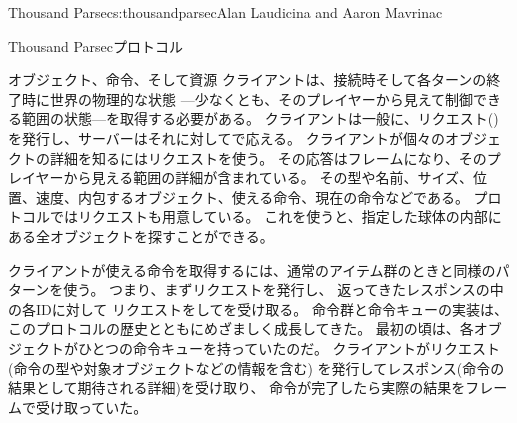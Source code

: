 \begin{aosachapter}{Thousand Parsec}{s:thousandparsec}{Alan Laudicina and Aaron Mavrinac}
\begin{aosasect1}{Thousand Parsecプロトコル}
\begin{aosasect2}{オブジェクト、命令、そして資源}
クライアントは、接続時そして各ターンの終了時に世界の物理的な状態
---少なくとも、そのプレイヤーから見えて制御できる範囲の状態---を取得する必要がある。
クライアントは一般に、リクエスト()
を発行し、サーバーはそれに対してで応える。
クライアントが個々のオブジェクトの詳細を知るにはリクエストを使う。
その応答はフレームになり、そのプレイヤーから見える範囲の詳細が含まれている。
その型や名前、サイズ、位置、速度、内包するオブジェクト、使える命令、現在の命令などである。
プロトコルではリクエストも用意している。
これを使うと、指定した球体の内部にある全オブジェクトを探すことができる。

クライアントが使える命令を取得するには、通常のアイテム群のときと同様のパターンを使う。
つまり、まずリクエストを発行し、
返ってきたレスポンスの中の各IDに対して
リクエストをしてを受け取る。
命令群と命令キューの実装は、このプロトコルの歴史とともにめざましく成長してきた。
最初の頃は、各オブジェクトがひとつの命令キューを持っていたのだ。
クライアントがリクエスト(命令の型や対象オブジェクトなどの情報を含む)
を発行してレスポンス(命令の結果として期待される詳細)を受け取り、
命令が完了したら実際の結果をフレームで受け取っていた。


\end{aosasect2}
\end{aosasect1}
\end{aosachapter}
